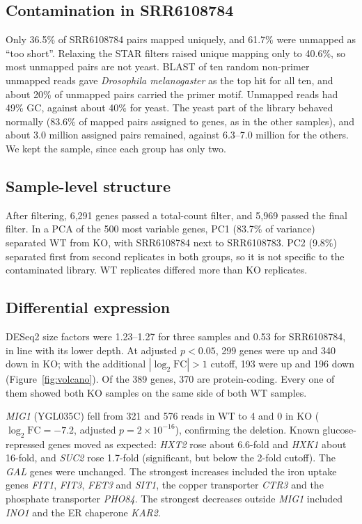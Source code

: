 \documentclass[11pt, a4paper]{article}
\begin{document}
\subsection{Contamination in SRR6108784}
Only 36.5\% of SRR6108784 pairs mapped uniquely, and 61.7\% were unmapped as ``too short''. Relaxing the STAR filters raised unique mapping only to 40.6\%, so most unmapped pairs are not yeast. BLAST of ten random non-primer unmapped reads gave \textit{Drosophila melanogaster} as the top hit for all ten, and about 20\% of unmapped pairs carried the primer motif. Unmapped reads had 49\% GC, against about 40\% for yeast. The yeast part of the library behaved normally (83.6\% of mapped pairs assigned to genes, as in the other samples), and about 3.0 million assigned pairs remained, against 6.3--7.0 million for the others. We kept the sample, since each group has only two.

\subsection{Sample-level structure}
After filtering, 6,291 genes passed a total-count filter, and 5,969 passed the final filter. In a PCA of the 500 most variable genes, PC1 (83.7\% of variance) separated WT from KO, with SRR6108784 next to SRR6108783. PC2 (9.8\%) separated first from second replicates in both groups, so it is not specific to the contaminated library. WT replicates differed more than KO replicates.

\subsection{Differential expression}
DESeq2 size factors were 1.23--1.27 for three samples and 0.53 for SRR6108784, in line with its lower depth. At adjusted $p<0.05$, 299 genes were up and 340 down in KO; with the additional $|\log_2\mathrm{FC}|>1$ cutoff, 193 were up and 196 down (Figure~\ref{fig:volcano}). Of the 389 genes, 370 are protein-coding. Every one of them showed both KO samples on the same side of both WT samples.

\textit{MIG1} (YGL035C) fell from 321 and 576 reads in WT to 4 and 0 in KO ($\log_2\mathrm{FC}=-7.2$, adjusted $p=2\times10^{-16}$), confirming the deletion. Known glucose-repressed genes moved as expected: \textit{HXT2} rose about 6.6-fold and \textit{HXK1} about 16-fold, and \textit{SUC2} rose 1.7-fold (significant, but below the 2-fold cutoff). The \textit{GAL} genes were unchanged. The strongest increases included the iron uptake genes \textit{FIT1}, \textit{FIT3}, \textit{FET3} and \textit{SIT1}, the copper transporter \textit{CTR3} and the phosphate transporter \textit{PHO84}. The strongest decreases outside \textit{MIG1} included \textit{INO1} and the ER chaperone \textit{KAR2}.
\end{document}

